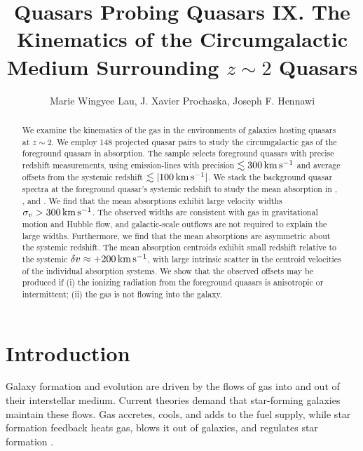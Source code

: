 \documentclass[iop]{emulateapj}
\begin{document}
\title{Quasars Probing Quasars IX. The Kinematics of the Circumgalactic Medium Surrounding
$z\sim2$ Quasars}

\author{Marie Wingyee Lau, J. Xavier Prochaska,
Joseph F. Hennawi
}

\begin{abstract}
We examine the kinematics of the gas in the environments of galaxies hosting quasars at $z\sim2$.
We employ 148 projected quasar pairs to study the circumgalactic gas of the foreground quasars in
absorption. The sample selects foreground quasars with precise redshift measurements, using
emission-lines with precision $\lesssim300\,{\rm km\,s^{-1}}$ and average offsets from the
systemic redshift $\lesssim|100\,{\rm km\,s^{-1}}|$. We stack the background quasar spectra at the
foreground quasar's systemic redshift to study the mean absorption in , ,
and . We find that the mean absorptions exhibit large velocity widths
$\sigma_v>300\,{\rm km\,s^{-1}}$. The observed widths are consistent with gas in gravitational
motion and Hubble flow, and galactic-scale outflows are not required to explain the large
widths. Furthermore, we find that the mean absorptions are asymmetric about the systemic redshift.
The mean absorption centroids exhibit small redshift relative to the
systemic $\delta v\approx+200\,{\rm km\,s^{-1}}$, with large intrinsic scatter in the centroid
velocities of the individual absorption systems. We show that the observed offsets may be produced
if (i) the ionizing radiation from the foreground quasars is anisotropic or intermittent; (ii) the
gas is not flowing into the galaxy.
\end{abstract}



\section{Introduction}
\label{sec:introduction}

Galaxy formation and evolution are driven by the flows of gas into and out of their interstellar
medium. Current theories demand that star-forming galaxies maintain these flows. Gas accretes,
cools, and adds to the fuel supply, while star formation feedback heats gas, blows it out of
galaxies, and regulates star formation \citep[for a review see][]{SomervilleDave15}.
\end{document}
